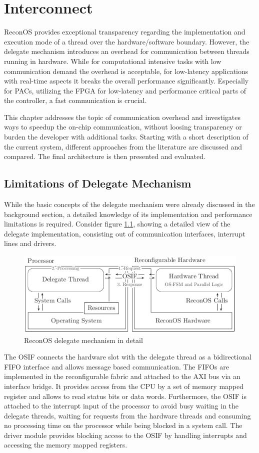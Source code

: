 \chapter{Interconnect}
\label{chap:interconnect}
ReconOS provides exceptional transparency regarding the implementation and
execution mode of a thread over the hardware/software boundary. However, the
delegate mechanism introduces an overhead for communication between threads
running in hardware. While for computational intensive tasks with low
communication demand the overhead is acceptable, for low-latency applications
with real-time aspects it breaks the overall performance significantly.
Especially for \acp{PAC}, utilizing the \ac{FPGA} for low-latency and
performance critical parts of the controller, a fast communication is crucial.

This chapter addresses the topic of communication overhead and investigates
ways to speedup the on-chip communication, without loosing transparency or
burden the developer with additional tasks. Starting with a short description
of the current system, different approaches from the literature are discussed
and compared. The final architecture is then presented and evaluated.

\section{Limitations of Delegate Mechanism}
While the basic concepts of the delegate mechanism were already discussed in
the background section, a detailed knowledge of its implementation and
performance limitations is required. Consider figure \ref{fig:delegate},
showing a detailed view of the delegate implementation, consisting out of
communication interfaces, interrupt lines and drivers.
\begin{figure}[tb]
	\centering
	\includegraphics{../figures/delegate}
	\caption{ReconOS delegate mechanism in detail}
	\label{fig:delegate}
\end{figure}
 The \ac{OSIF} connects the hardware slot with the delegate thread as a
bidirectional \ac{FIFO} interface and allows message based communication. The
\acp{FIFO} are implemented in the reconfigurable fabric and attached to the
\ac{AXI} bus via an interface bridge. It provides access from the \ac{CPU} by
a set of memory mapped register and allows to read status bits or data words.
Furthermore, the \ac{OSIF} is attached to the interrupt input of the processor
to avoid busy waiting in the delegate threads, waiting for requests from the
hardware threads and consuming no processing time on the processor while being
blocked in a system call. The driver module provides blocking access to the
\ac{OSIF} by handling interrupts and accessing the memory mapped registers.

